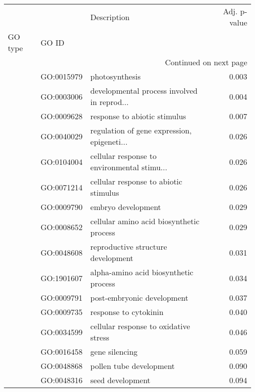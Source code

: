 \begin{longtable}{lllr}
\toprule
   &            &                                  Description &  Adj. p-value \\
GO type & GO ID &                                              &               \\
\midrule
\endhead
\midrule
\multicolumn{4}{r}{{Continued on next page}} \\
\midrule
\endfoot

\bottomrule
\endlastfoot
\multirow{16}{*}{BP} & GO:0015979 &                               photosynthesis &         0.003 \\
   & GO:0003006 &  developmental process involved in reprod... &         0.004 \\
   & GO:0009628 &                 response to abiotic stimulus &         0.007 \\
   & GO:0040029 &  regulation of gene expression, epigeneti... &         0.026 \\
   & GO:0104004 &  cellular response to environmental stimu... &         0.026 \\
   & GO:0071214 &        cellular response to abiotic stimulus &         0.026 \\
   & GO:0009790 &                           embryo development &         0.029 \\
   & GO:0008652 &     cellular amino acid biosynthetic process &         0.029 \\
   & GO:0048608 &           reproductive structure development &         0.031 \\
   & GO:1901607 &        alpha-amino acid biosynthetic process &         0.034 \\
   & GO:0009791 &                   post-embryonic development &         0.037 \\
   & GO:0009735 &                        response to cytokinin &         0.040 \\
   & GO:0034599 &        cellular response to oxidative stress &         0.046 \\
   & GO:0016458 &                               gene silencing &         0.059 \\
   & GO:0048868 &                      pollen tube development &         0.090 \\
   & GO:0048316 &                             seed development &         0.094 \\
\end{longtable}
